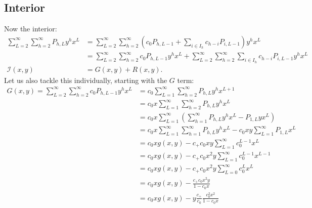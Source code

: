 	\subsection{Interior}
	Now the interior:
	\begin{align}
		\sum_{L=2}^\infty\sum_{h=2}^\infty P_{h, L} y^hx^L &= \sum_{L=2}^\infty\sum_{h=2}^\infty \left(c_0P_{h, L - 1} + \sum_{i\in I_h} c_{h-i}P_{i, L-1}\right) y^hx^L\\
		&= \sum_{L=2}^\infty\sum_{h=2}^\infty c_0P_{h, L - 1}y^hx^L + \sum_{L=2}^\infty\sum_{h=2}^\infty\sum_{i\in I_h} c_{h-i}P_{i, L-1}y^hx^L\\
		\mathcal{I}(x, y)&= G(x, y) + R(x, y).
	\end{align}
	Let us also tackle this individually, starting with the $G$ term:
	\begin{align}
		G(x, y) = \sum_{L=2}^\infty\sum_{h=2}^\infty c_0P_{h, L - 1}y^hx^L &= c_0\sum_{L=1}^\infty\sum_{h=2}^\infty P_{h, L}y^hx^{L+1}\\
		&= c_0x\sum_{L=1}^\infty\sum_{h=2}^\infty P_{h, L}y^hx^L\\
		&= c_0x\sum_{L=1}^\infty\left( \sum_{h=1}^\infty P_{h, L}y^hx^L -  P_{1, L}yx^L\right)\\
		&= c_0x\sum_{L=1}^\infty\sum_{h=1}^\infty P_{h, L}y^hx^L -  c_0xy\sum_{L=1}^\infty P_{1, L}x^L\\
		&= c_0xg(x, y) -  c_+ c_0xy\sum_{L=1}^\infty c_0^{L-1}x^L\\
		&= c_0xg(x, y) -  c_+ c_0x^2y\sum_{L=1}^\infty c_0^{L-1}x^{L-1}\\
		&= c_0xg(x, y) -  c_+ c_0 x^2y \sum_{L=0}^\infty c_0^{L}x^L\\
		&= c_0xg(x, y) -  \frac{c_+ c_0x^2y}{1-c_0x}\\
		&= c_0xg(x, y) -  y\frac{c_+}{c_0}\frac{c_0^2x^2}{1-c_0x}
	\end{align}
	
